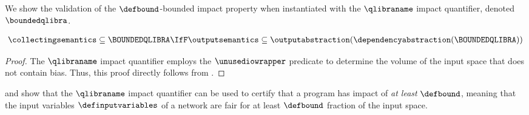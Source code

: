 We show the validation of the $\defbound$-bounded impact property when instantiated with the $\qlibraname$ impact quantifier,
denoted $\boundedqlibra$.

\begin{lemma}
  \begin{align*}
    \collectingsemantics \subseteq \BOUNDEDQLIBRA \IfF \outputsemantics \subseteq \outputabstraction(\dependencyabstraction(\BOUNDEDQLIBRA))
  \end{align*}
\end{lemma}
\begin{proof}
  The $\qlibraname$ impact quantifier employs the $\unusediowrapper$ predicate to determine the volume of the input space that does not contain bias.
  Thus, this proof directly follows from .
\end{proof}

 and  show that the $\qlibraname$ impact quantifier can be used to certify that a program has impact of \emph{at least} $\defbound$, meaning that the input variables $\definputvariables$ of a network are fair for at least $\defbound$ fraction of the input space.




